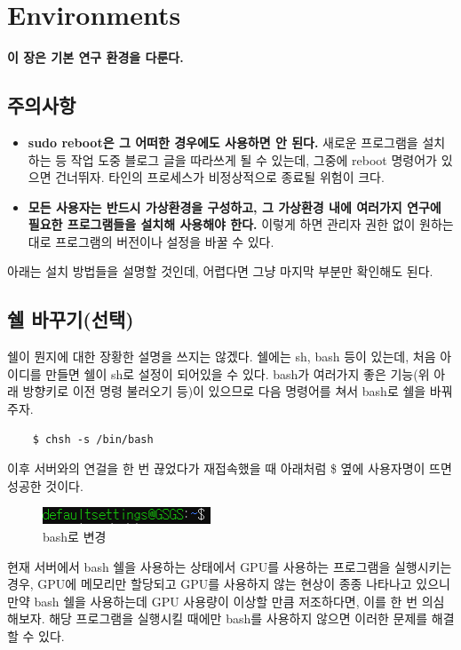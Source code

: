 
\graphicspath{{./chap4/images/}}  
\chapter{Environments}

\textbf{이 장은 기본 연구 환경을 다룬다.}
\section{주의사항}
\begin{itemize}
 \item \textbf{sudo reboot은 그 어떠한 경우에도 사용하면 안 된다.} 새로운 프로그램을 설치하는 등 작업 도중 블로그 글을 따라쓰게 될 수 있는데, 그중에 reboot 명령어가 있으면 건너뛰자. 타인의 프로세스가 비정상적으로 종료될 위험이 크다.
 \item \textbf{모든 사용자는 반드시 가상환경을 구성하고, 그 가상환경 내에 여러가지 연구에 필요한 프로그램들을 설치해 사용해야 한다.} 이렇게 하면 관리자 권한 없이 원하는 대로 프로그램의 버전이나 설정을 바꿀 수 있다.
\end{itemize}


	 
아래는 설치 방법들을 설명할 것인데, 어렵다면 그냥 마지막 부분만 확인해도 된다.
\section{쉘 바꾸기(선택)}
 쉘이 뭔지에 대한 장황한 설명을 쓰지는 않겠다. 쉘에는 sh, bash 등이 있는데, 처음 아이디를 만들면 쉘이 sh로 설정이 되어있을 수 있다. bash가 여러가지 좋은 기능(위 아래 방향키로 이전 명령 불러오기 등)이 있으므로 다음 명령어를 쳐서 bash로 쉘을 바꿔주자.
\begin{lstlisting}
    $ chsh -s /bin/bash
\end{lstlisting}
이후 서버와의 연걸을 한 번 끊었다가 재접속했을 때 아래처럼 \$ 옆에 사용자명이 뜨면 성공한 것이다.
\begin{figure}[H]
	\begin{center}
        \includegraphics[width=5cm]{bash}
        \caption{bash로 변경}
    \end{center}
\end{figure}
현재 서버에서 bash 쉘을 사용하는 상태에서 GPU를 사용하는 프로그램을 실행시키는 경우, GPU에 메모리만 할당되고 GPU를 사용하지 않는 현상이 종종 나타나고 있으니 만약 bash 쉘을 사용하는데 GPU 사용량이 이상할 만큼 저조하다면, 이를 한 번 의심해보자. 해당 프로그램을 실행시킬 때에만 bash를 사용하지 않으면 이러한 문제를 해결할 수 있다.
